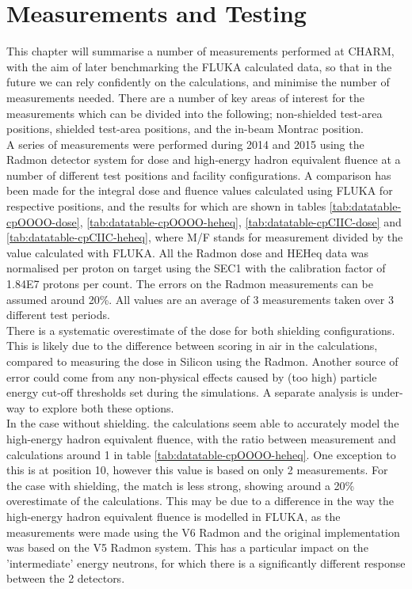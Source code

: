 %

\newpage
\section{Measurements and Testing}
This chapter will summarise a number of measurements performed at CHARM, with the aim of later benchmarking the FLUKA calculated data, so that in the future we can rely confidently on the calculations, and minimise the number of measurements needed. There are a number of key areas of interest for the measurements which can be divided into the following; non-shielded test-area positions, shielded test-area positions, and the in-beam Montrac position. \\

A series of measurements were performed during 2014 and 2015 \cite{charmcalibration} using the Radmon \cite{Wijnands_radmon} detector system for dose and high-energy hadron equivalent fluence at a number of different test positions and facility configurations. A comparison has been made for the integral dose and fluence values calculated using FLUKA for respective positions, and the results for which are shown in tables \ref{tab:datatable-cpOOOO-dose}, \ref{tab:datatable-cpOOOO-heheq}, \ref{tab:datatable-cpCIIC-dose} and \ref{tab:datatable-cpCIIC-heheq}, where M/F stands for measurement divided by the value calculated with FLUKA. All the Radmon dose and HEHeq data was normalised per proton on target using the SEC1 with the calibration factor of 1.84E7 protons per count. The errors on the Radmon measurements can be assumed around 20\%. All values are an average of 3 measurements taken over 3 different test periods. \\

There is a systematic overestimate of the dose for both shielding configurations. This is likely due to the difference between scoring in air in the calculations, compared to measuring the dose in Silicon using the Radmon. Another source of error could come from any non-physical effects caused by (too high) particle energy cut-off thresholds set during the simulations.  A separate analysis is under-way to explore both these options. \\

In the case without shielding. the calculations seem able to accurately model the high-energy hadron equivalent fluence, with the ratio between measurement and calculations around 1 in table \ref{tab:datatable-cpOOOO-heheq}. One exception to this is at position 10, however this value is based on only 2 measurements. For the case with shielding, the match is less strong, showing around a 20\% overestimate of the calculations. This may be due to a difference in the way the high-energy hadron equivalent fluence is modelled in FLUKA, as the measurements were made using the V6 Radmon and the original implementation was based on the V5 Radmon system. This has a particular impact on the 'intermediate' energy neutrons, for which there is a significantly different response between the 2 detectors. \\

